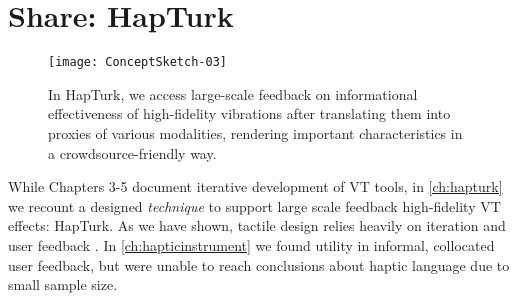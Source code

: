 
\chapter{Share: HapTurk}
\label{ch:hapturk}


\begin{figure}[h] %
   \centering
   \texttt{[image: ConceptSketch-03]} 
   \caption{In HapTurk, we access large-scale feedback on informational effectiveness of high-fidelity vibrations after translating them into proxies of various modalities, rendering important characteristics in a crowdsource-friendly way.}
   \label{fig:hapturk:conceptsketch}
\end{figure}


While Chapters 3-5 document iterative development of VT tools, in \autoref{ch:hapturk} we recount a designed \emph{technique} to support large scale feedback high-fidelity VT effects: HapTurk.
As we have shown,
tactile design relies heavily on iteration and user feedback \cite{Schneider2014}.
In \autoref{ch:hapticinstrument} we found utility in informal, collocated user feedback, but were unable to reach conclusions about haptic language due to small sample size.
 
